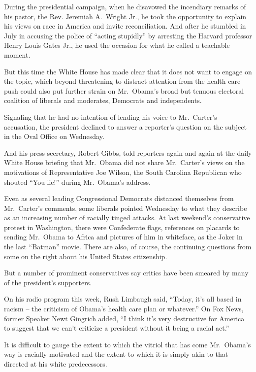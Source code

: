 ﻿\documentclass[12pt]{article}
\begin{document}
During the presidential campaign, when he disavowed the incendiary remarks of his pastor, the Rev.
Jeremiah A.~Wright Jr., he took the opportunity to explain his views on race in America and invite
reconciliation. And after he stumbled in July in accusing the police of ``acting stupidly'' by
arresting the Harvard professor Henry Louis Gates Jr., he used the occasion for what he called a
teachable moment.

But this time the White House has made clear that it does not want to engage on the topic, which
beyond threatening to distract attention from the health care push could also put further strain on
Mr.~Obama's broad but tenuous electoral coalition of liberals and moderates, Democrats and
independents.

Signaling that he had no intention of lending his voice to Mr.~Carter's accusation, the president
declined to answer a reporter's question on the subject in the Oval Office on Wednesday.

And his press secretary, Robert Gibbs, told reporters again and again at the daily White House
briefing that Mr.~Obama did not share Mr.~Carter's views on the motivations of Representative Joe
Wilson, the South Carolina Republican who shouted ``You lie!'' during Mr.~Obama's address.

Even as several leading Congressional Democrats distanced themselves from Mr.~Carter's comments,
some liberals pointed Wednesday to what they describe as an increasing number of racially tinged
attacks. At last weekend's conservative protest in Washington, there were Confederate flags,
references on placards to sending Mr.~Obama to Africa and pictures of him in whiteface, as the Joker
in the last ``Batman'' movie. There are also, of course, the continuing questions from some on the
right about his United States citizenship.

But a number of prominent conservatives say critics have been smeared by many of the president's
supporters.

On his radio program this week, Rush Limbaugh said, ``Today, it's all based in racism -- the
criticism of Obama's health care plan or whatever.'' On Fox News, former Speaker Newt Gingrich
added, ``I think it's very destructive for America to suggest that we can't criticize a president
without it being a racial act.''

It is difficult to gauge the extent to which the vitriol that has come Mr.~Obama's way is racially
motivated and the extent to which it is simply akin to that directed at his white predecessors.
\end{document}

